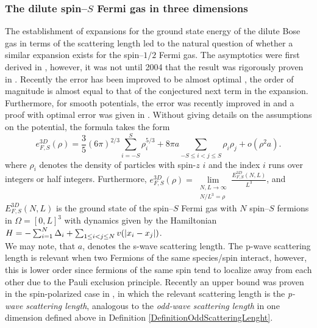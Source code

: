 \subsubsection{The dilute spin--$ S $ Fermi gas in three dimensions}
The establishment of expansions for the ground state energy of the dilute Bose gas in terms of the scattering length led to the natural question of whether a similar expansion exists for the spin--$ 1/2 $ Fermi gas. The asymptotics were first derived in \cite{huang1957quantum,lee1957many}, however, it was not until 2004 that the result was rigorously proven in \cite{lieb2005ground}. Recently the error has been improved to be almost optimal \cite{lauritsen2023almost}, \ie the order of magnitude is almost equal to that of the conjectured next term in the expansion. Furthermore, for smooth potentials, the error was recently improved in  \cite{falconi2021dilute} and a proof with optimal error was given in \cite{giacomelli2022optimal}. Without giving details on the assumptions on the potential, the formula takes the form
\begin{equation}
e^{3D}_{F,S}(\rho)=\frac{3}{5}\left(6\pi\right)^{2/3}\sum_{i=-S}^{S}\rho_i^{5/3}+8\pi a\sum_{-S\leq i<j\leq S}\rho_i\rho_j+o\left(\rho^{2}a\right).
\end{equation}
where $ \rho_i $ denotes the density of particles with spin-$ z $ $ i $ and the index $ i $ runs over integers or half integers. Furthermore, $ e^{3D}_{F,S}(\rho)=\lim\limits_{\substack{N,L\to\infty\\ N/L^3=\rho}}\frac{E^{3D}_{F,S}(N,L)}{L^3} $, and $ E^{3D}_{F,S}(N,L) $ is the ground state of the spin--$ S $ Fermi gas with $ N $ spin--$ S $ fermions in $ \Omega=[0,L]^3 $ with dynamics given by the Hamiltonian $ H=-\sum_{i=1}^{N}\Delta_i+\sum_{1\leq i<j\leq N} v(\left\lvert x_i-x_j \right\rvert) $.\\
We may note, that $ a $, denotes the s-wave scattering length. The p-wave scattering length is relevant when two Fermions of the same species/spin interact, however, this is lower order since fermions of the same spin tend to localize away from each other due to the Pauli exclusion principle. Recently an upper bound was proven in the spin-polarized case in \cite{lauritsen2023ground}, in which the relevant scattering length is the \emph{p-wave scattering length}, analogous to the \emph{odd-wave scattering length} in one dimension defined above in Definition \ref{DefinitionOddScatteringLenght}.

